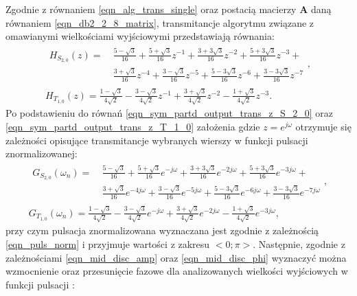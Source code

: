 Zgodnie z równaniem \eqref{eqn_alg_trans_single} oraz postacią macierzy $\mathbf{A}$ daną równaniem \eqref{eqn_db2_2_8_matrix}, transmitancje algorytmu związane z omawianymi wielkościami wyjściowymi przedstawiają równania:
\begin{gather}
\begin{split}
H_{S_{2,0}} \left( z \right) = ~
& \frac{5 - \sqrt{3}}{16} + \frac{5 + \sqrt{3}}{16} z^{-1} + \frac{3 + 3 \sqrt{3}}{16} z^{-2} + \frac{5 + 3 \sqrt{3}}{16} z^{-3} + \\
& \frac{3 + \sqrt{3}}{16} z^{-4} + \frac{3 - \sqrt{3}}{16} z^{-5} + \frac{5 - 3 \sqrt{3}}{16} z^{-6} + \frac{3 - 3 \sqrt{3}}{16} z^{-7}
\end{split}
\label{eqn_sym_partd_output_trans_z_S_2_0}, \\
H_{T_{1,0}} \left( z \right) = \frac{1 - \sqrt{3}}{4 \sqrt{2}} - \frac{3 - \sqrt{3}}{4 \sqrt{2}} z^{-1} + \frac{3 + \sqrt{3}}{4 \sqrt{2}} z^{-2} - \frac{1 + \sqrt{3}}{4 \sqrt{2}} z^{-3} \label{eqn_sym_partd_output_trans_z_T_1_0}.
\end{gather}
Po podstawieniu do równań \eqref{eqn_sym_partd_output_trans_z_S_2_0} oraz \eqref{eqn_sym_partd_output_trans_z_T_1_0} założenia gdzie $z = e^{j\omega}$ otrzymuje się zależności opisujące transmitancje wybranych wierszy w funkcji pulsacji znormalizowanej:
\begin{gather}
\begin{split}
G_{S_{2,0}} \left( \omega_{n} \right) = ~
& \frac{5 - \sqrt{3}}{16} + \frac{5 + \sqrt{3}}{16} e^{-j\omega} + \frac{3 + 3 \sqrt{3}}{16} e^{-2j\omega} + \frac{5 + 3 \sqrt{3}}{16} e^{-3j\omega} + \\
& \frac{3 + \sqrt{3}}{16} e^{-4j\omega} + \frac{3 - \sqrt{3}}{16} e^{-5j\omega} + \frac{5 - 3 \sqrt{3}}{16} e^{-6j\omega} + \frac{3 - 3 \sqrt{3}}{16} e^{-7j\omega}
\end{split}
\label{eqn_sym_partd_output_trans_wn_S_2_0}, \\
G_{T_{1,0}} \left( \omega_{n} \right) = \frac{1 - \sqrt{3}}{4 \sqrt{2}} - \frac{3 - \sqrt{3}}{4 \sqrt{2}} e^{-j\omega} + \frac{3 + \sqrt{3}}{4 \sqrt{2}} e^{-2j\omega} - \frac{1 + \sqrt{3}}{4 \sqrt{2}} e^{-3j\omega} \label{eqn_sym_partd_output_trans_wn_T_1_0},
\end{gather}
przy czym pulsacja znormalizowana wyznaczana jest zgodnie z zależnością \eqref{eqn_puls_norm} i przyjmuje wartości z zakresu $<0;\pi>$. Następnie, zgodnie z zależnościami \eqref{eqn_mid_disc_amp} oraz \eqref{eqn_mid_disc_phi} wyznaczyć można wzmocnienie oraz przesunięcie fazowe dla analizowanych wielkości wyjściowych w funkcji pulsacji \cite{proakis_dsp}:

